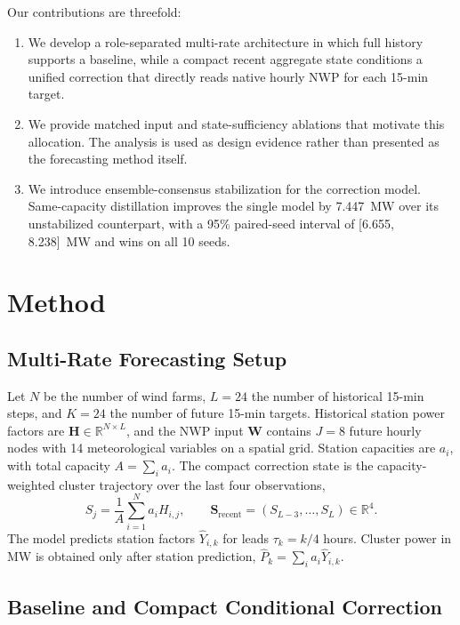 \documentclass[conference]{IEEEtran}
\begin{document}
Our contributions are threefold:
\begin{enumerate}
    \item We develop a role-separated multi-rate architecture in which full history supports a baseline, while a compact recent aggregate state conditions a unified correction that directly reads native hourly NWP for each 15-min target.
    \item We provide matched input and state-sufficiency ablations that motivate this allocation. The analysis is used as design evidence rather than presented as the forecasting method itself.
    \item We introduce ensemble-consensus stabilization for the correction model. Same-capacity distillation improves the single model by 7.447~MW over its unstabilized counterpart, with a 95\% paired-seed interval of [6.655, 8.238]~MW and wins on all 10 seeds.
\end{enumerate}

\section{Method}

\subsection{Multi-Rate Forecasting Setup}

Let $N$ be the number of wind farms, $L=24$ the number of historical 15-min steps, and $K=24$ the number of future 15-min targets. Historical station power factors are $\mathbf H\in\mathbb R^{N\times L}$, and the NWP input $\mathbf W$ contains $J=8$ future hourly nodes with 14 meteorological variables on a spatial grid. Station capacities are $a_i$, with total capacity $A=\sum_i a_i$. The compact correction state is the capacity-weighted cluster trajectory over the last four observations,
\begin{equation}
 S_j=\frac{1}{A}\sum_{i=1}^{N}a_i H_{i,j},\qquad
 \mathbf S_{\mathrm{recent}}=(S_{L-3},\ldots,S_L)\in\mathbb R^4.
 \label{eq:state}
\end{equation}
The model predicts station factors $\hat Y_{i,k}$ for leads $\tau_k=k/4$ hours. Cluster power in MW is obtained only after station prediction, $\hat P_k=\sum_i a_i\hat Y_{i,k}$.

\subsection{Baseline and Compact Conditional Correction}
\end{document}
